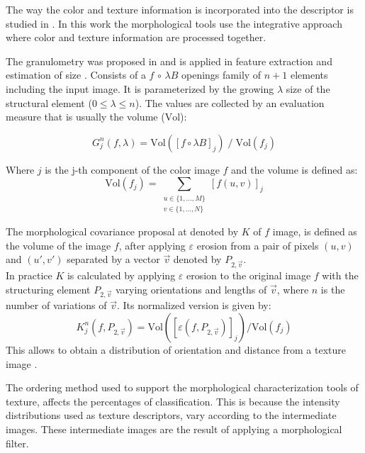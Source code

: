 The way the color and texture information is incorporated into the descriptor is studied in \cite{palm2004color,van2005parallel}. In this work the morphological tools use the integrative approach where color and texture information are processed together.

The granulometry  was proposed in \cite{matheron1975random}  and is applied in feature extraction and estimation of size \cite{vincent2000granulometries,soille2013morphological}. Consists of a  $f \,\circ \, \lambda B $ openings family of $n+1$ elements including the input image. It is parameterized by the growing  $\lambda$ size of the structural element  ($0 \leq \lambda \leq n $). The values are collected by an evaluation measure that is usually the volume ($\mathrm{Vol}$):

\begin{equation}
G^{n}_{j}(f,\lambda)= \mathrm{Vol}([f\circ \lambda B ]_{j}) \; / \; \mathrm{Vol}(f_{j})
\end{equation}

Where $j$ is the j-th component of the color image $f$ and the volume is defined as:
\begin{equation}
\mathrm{Vol}(f_j) = \sum_{\substack{u\in \{1, ..., M\}\\ v \in \{1, ..., N\}}}[f(u,v)]_{j} 
\end{equation}

The morphological covariance proposal at \cite{matheron1975random,maragos1989pattern} denoted by  $K$ of $f$ image, is defined as the volume of the image $f$, after applying $\varepsilon$  erosion from a pair of pixels $(u,v)$ and  $(u',v')$ separated by a vector $\vec{v}$ denoted by  $P_{2,\vec{v}}$.\\
In practice $K $ is calculated by applying $\varepsilon$ erosion  to the original image $f$ with the structuring element $P_{2,\vec{v}}$ varying orientations and lengths of $\vec{v}$, where $n$ is the number of variations of $\vec{v}$. Its normalized version is given by:
\begin{equation}
K^{n}_{j}(f,P_{2,\vec{v}})  = \mathrm{Vol}([\varepsilon(f,P_{2,\vec{v}})]_{j}) / \mathrm{Vol}(f_{j})
\end{equation}
This allows to obtain a distribution of orientation and distance from a texture image \cite{aptoula2007morphological}.

The ordering method used to support the morphological characterization tools of texture, affects the percentages of classification. This is because the intensity distributions used as texture descriptors, vary according to the intermediate images. These intermediate images are the result of applying a morphological filter.

